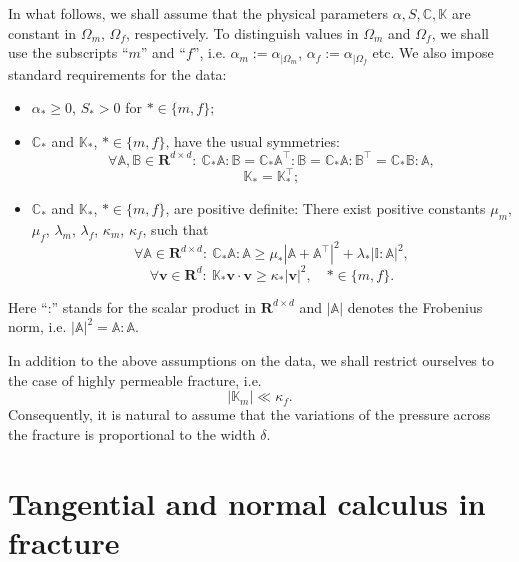 \documentclass[a4paper]{article}
\numberwithin{equation}{section}
\def\CC{\tn C}
\def\Real{{\mathbf R}} %
\def\tn#1{{\mathbb{#1}}}    %
\def\vc#1{\mathbf{#1}}     %
\def\vv{\vc v}
\newcommand{\eq}[1]{\begin{equation}#1\end{equation}}
\newcommand{\eqs}[1]{\begin{equation*}#1\end{equation*}}
\begin{document}
In what follows, we shall assume that the physical parameters $\alpha,S,\CC,\tn K$ are constant in $\Omega_m$, $\Omega_f$, respectively.
To distinguish values in $\Omega_m$ and $\Omega_f$, we shall use the subscripts ``$m$'' and ``$f$'', i.e. $\alpha_m := \alpha_{|\Omega_m}$, $\alpha_f := \alpha_{|\Omega_f}$ etc.
We also impose standard requirements for the data:
\begin{itemize}
\item $\alpha_*\ge 0$, $S_*>0$ for $*\in\{m,f\}$;
\item $\CC_*$ and $\tn K_*$, $*\in\{m,f\}$, have the usual symmetries:
\eqs{ \forall \tn A,\tn B\in\Real^{d\times d}:~ \CC_*\tn A:\tn B=\CC_*\tn A^\top:\tn B=\CC_*\tn A:\tn B^\top=\CC_*\tn B:\tn A, }
\eqs{ \tn K_* = \tn K_*^\top; }
\item $\CC_*$ and $\tn K_*$, $*\in\{m,f\}$, are positive definite: %
There exist positive constants $\mu_m$, $\mu_f$, $\lambda_m$, $\lambda_f$, $\kappa_m$, $\kappa_f$, such that
\eq{ \label{eq:pos_def_C_gen} \forall\tn A\in\Real^{d\times d}:~\CC_*\tn A:\tn A \ge \mu_*\left|\tn A+\tn A^\top\right|^2 + \lambda_*|\tn I:\tn A|^2, }
\eq{ \label{eq:pos_def_K} \forall\vv\in\Real^d:~\tn K_*\vv\cdot\vv \ge \kappa_*|\vv|^2,\quad *\in\{m,f\}. }
\end{itemize}
Here ``:'' stands for the scalar product in $\Real^{d\times d}$ and $|\tn A|$ denotes the Frobenius norm, i.e. $|\tn A|^2=\tn A:\tn A$.

In addition to the above assumptions on the data, we shall restrict ourselves to the case of highly permeable fracture, i.e.
\eq{\label{eq:asm_permeable_frac} |\tn K_m|\ll \kappa_f. }
Consequently, it is natural to assume that the variations of the pressure across the fracture is proportional to the width $\delta$.



\section{Tangential and normal calculus in fracture}\label{sec:calculus}
\end{document}
